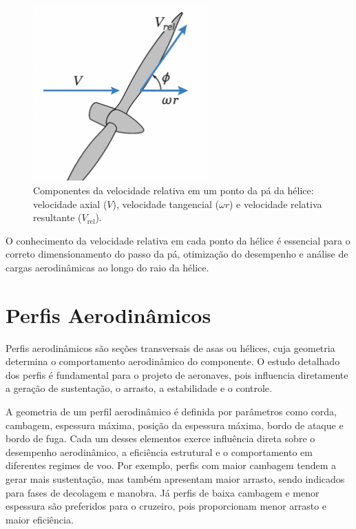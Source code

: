 \begin{figure}[H]
    \centering
    \includegraphics[width=0.6\textwidth]{figures/helice_velocidade_relativa.png}
    \caption{Componentes da velocidade relativa em um ponto da pá da hélice: velocidade axial (\(V\)), velocidade tangencial (\(\omega r\)) e velocidade relativa resultante (\(V_{\text{rel}}\)).}
    \label{fig:helice_velocidade_relativa}
\end{figure}

O conhecimento da velocidade relativa em cada ponto da hélice é essencial para o correto dimensionamento do passo da pá, otimização do desempenho e análise de cargas aerodinâmicas ao longo do raio da hélice.

\section{Perfis Aerodinâmicos}
Perfis aerodinâmicos são seções transversais de asas ou hélices, cuja geometria determina o comportamento aerodinâmico do componente. O estudo detalhado dos perfis é fundamental para o projeto de aeronaves, pois influencia diretamente a geração de sustentação, o arrasto, a estabilidade e o controle.

A geometria de um perfil aerodinâmico é definida por parâmetros como corda, cambagem, espessura máxima, posição da espessura máxima, bordo de ataque e bordo de fuga. Cada um desses elementos exerce influência direta sobre o desempenho aerodinâmico, a eficiência estrutural e o comportamento em diferentes regimes de voo. Por exemplo, perfis com maior cambagem tendem a gerar mais sustentação, mas também apresentam maior arrasto, sendo indicados para fases de decolagem e manobra. Já perfis de baixa cambagem e menor espessura são preferidos para o cruzeiro, pois proporcionam menor arrasto e maior eficiência.

